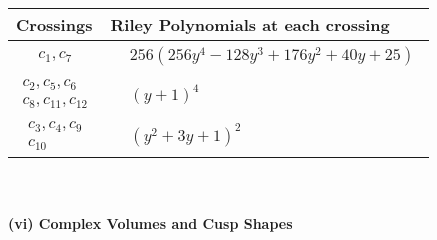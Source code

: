 \documentclass[1p]{elsarticle_modified}
\theoremstyle{definition}
\begin{document}
\begin{tabular}{m{50pt}|m{274pt}}
Crossings & \hspace{64pt}Riley Polynomials at each crossing \\
\hline $$\begin{aligned}c_{1},c_{7}\end{aligned}$$&$\begin{aligned}
&256(256 y^4-128 y^3+176 y^2+40 y+25)
\end{aligned}$\\
\hline $$\begin{aligned}c_{2},c_{5},c_{6}\\c_{8},c_{11},c_{12}\end{aligned}$$&$\begin{aligned}
&(y+1)^4
\end{aligned}$\\
\hline $$\begin{aligned}c_{3},c_{4},c_{9}\\c_{10}\end{aligned}$$&$\begin{aligned}
&(y^2+3 y+1)^2
\end{aligned}$\\
\hline
\end{tabular}\\~\\
\newpage\flushleft \textbf{(vi) Complex Volumes and Cusp Shapes}
\end{document}
